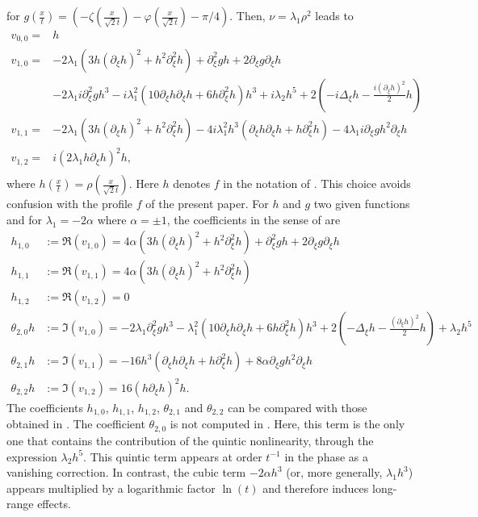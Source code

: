 \documentclass[a4paper, 15pt]{article}
\numberwithin{equation}{section}
\begin{document}
for $g\left(\frac{x}{t}\right)=(-\zeta\left(\frac{x}{\sqrt{2}t}\right)-\varphi\left(\frac{x}{\sqrt{2}t}\right)-\pi/4)$. Then, $\nu=\lambda_1\rho^2$ leads to
\begin{align*}
v_{0,0}=&h\\
v_{1,0}=&-2\lambda_1(3h(\partial_\xi h)^2+h^2\partial^2_\xi h)+\partial_\xi^2gh+2\partial_\xi g\partial_\xi h\\
&-2\lambda_1i\partial_\xi^2gh^3-i\lambda_1^2(10\partial_\xi h\partial_\xi h+6h\partial^2_\xi h) h^3+i\lambda_2h^5+2(-i\Delta_\xi h-\frac{i(\partial_\xi h)^2}{2}h)\\
v_{1,1}=&-2\lambda_1(3h(\partial_\xi h)^2+h^2\partial^2_\xi h)-4i\lambda_1^2h^3(\partial_\xi h\partial_\xi h+h\partial^2_\xi h)-4\lambda_1i\partial_\xi gh^2\partial_\xi h\\
v_{1,2}=&i(2\lambda_1h\partial_\xi h)^2h,\\
\end{align*}
where $h\left(\frac{x}{t}\right)=\rho\left(\frac{x}{\sqrt{2}t}\right)$. Here $h$ denotes $f$ in the notation of \cite{10.1063/1.522967}. This choice avoids confusion with the profile $f$ of the present paper. For $h$ and $g$ two given functions and for $\lambda_1=-2\alpha$ where $\alpha=\pm1$, the coefficients in the sense of \cite{10.1063/1.522967} are
\begin{align*}
h_{1,0}&:=\Re(v_{1,0})=4\alpha(3h(\partial_\xi h)^2+h^2\partial^2_\xi h)+\partial_\xi^2gh+2\partial_\xi g\partial_\xi h\\
h_{1,1}&:=\Re(v_{1,1})=4\alpha(3h(\partial_\xi h)^2+h^2\partial^2_\xi h)\\
h_{1,2}&:=\Re(v_{1,2})=0\\
\theta_{2,0}h&:=\Im(v_{1,0})=-2\lambda_1\partial_\xi^2gh^3-\lambda_1^2(10\partial_\xi h\partial_\xi h+6h\partial^2_\xi h) h^3+2(-\Delta_\xi h-\frac{(\partial_\xi h)^2}{2}h)+\lambda_2h^5\\
\theta_{2,1}h&:=\Im(v_{1,1})=-16h^3(\partial_\xi h\partial_\xi h+h\partial^2_\xi h)+8\alpha\partial_\xi gh^2\partial_\xi h\\
\theta_{2,2}h&:=\Im(v_{1,2})=16(h\partial_\xi h)^2h.
\end{align*}
The coefficients $h_{1,0}$, $h_{1,1}$, $h_{1,2}$, $\theta_{2,1}$ and $\theta_{2,2}$ can be compared with those obtained in \cite{10.1063/1.522967}. The coefficient $\theta_{2,0}$ is not computed in \cite{10.1063/1.522967}. Here, this term is the only one that contains the contribution of the quintic nonlinearity, through the expression $\lambda_2h^5$. This quintic term appears at order $t^{-1}$ in the phase as a vanishing correction. In contrast, the cubic term $-2\alpha h^3$ (or, more generally, $\lambda_1 h^3$) appears multiplied by a logarithmic factor $\ln(t)$ and therefore induces long-range effects. 
\printbibliography
\end{document}
